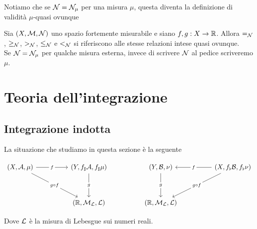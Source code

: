 \documentclass{article}
\renewcommand\A{\mc{A}}
\renewcommand\N{\mc{N}}
\begin{document}
Notiamo che se $\N = \N_\mu$ per una misura $\mu$, questa diventa la definizione di validità $\mu$-quasi ovunque

\begin{notation}
    Sia $(X,\M,\N)$ uno spazio fortemente misurabile e siano $f, g : X \to \mathbb{R}$. Allora $=_\N$, $\ge_\N$, $>_\N$, $\le_\N$ e $<_\N$ si riferiscono alle stesse relazioni intese quasi ovunque.\\
    Se $\N = \N_\mu$ per qualche misura esterna, invece di scrivere $\N$ al pedice scriveremo $\mu$.
\end{notation}

\pagebreak
\section{Teoria dell'integrazione}

\subsection{Integrazione indotta}

La situazione che studiamo in questa sezione è la seguente

\[\begin{tikzcd}
	{(X,\A,\mu)} && {(Y, f_\sharp\A, f_\sharp\mu)} && {(Y, \B, \nu)} && {(X, f_\flat\B, f_\flat\nu)} \\
	\\
	&& {(\R, \M_\L, \L)} && {(\R,\M_\L, \L)}
	\arrow["f"{description}, from=1-1, to=1-3]
	\arrow["{g \circ f}"{description}, from=1-1, to=3-3]
	\arrow["g"{description}, from=1-3, to=3-3]
	\arrow["g"{description}, from=1-5, to=3-5]
	\arrow["f"{description}, from=1-7, to=1-5]
	\arrow["{g \circ f}"{description}, from=1-7, to=3-5]
\end{tikzcd}\]

Dove $\mathcal{L}$ è la misura di Lebesgue sui numeri reali.
\end{document}
